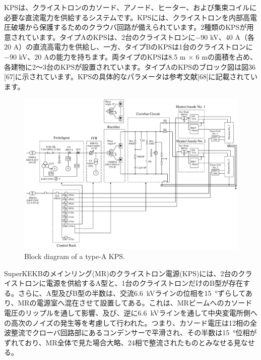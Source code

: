 \documentclass[book,openany]{jlreq}
\theoremstyle{definition}
\begin{document}
KPSは、クライストロンのカソード、アノード、ヒーター、および集束コイルに必要な直流電力を供給するシステムです。KPSには、クライストロンを内部高電圧破壊から保護するためのクラウバ回路が備えられています。2種類のKPSが用意されています。タイプAのKPSは、2台のクライストロンに−90 kV、40 A（各20 A）の直流高電力を供給し、一方、タイプBのKPSは1台のクライストロンに−90 kV、20 Aの能力を持ちます。両タイプのKPSは8.5 m × 6 mの面積を占め、各建物に2～3台のKPSが設置されています。タイプAのKPSのブロック図は図36 [67]に示されています。KPSの具体的なパラメータは参考文献[68]に記載されています。
%
\begin{figure}[!htt]
    \begin{center}
        \includegraphics[width=\linewidth]{figs/skeleton-diagram.pdf}
        \caption{Block diagram of a type-A KPS.}
        \label{fig:KPS}
    \end{center}
\end{figure}


SuperKEKBのメインリング(MR)のクライストロン電源(KPS)には、2台のクライストロンに電源を供給するA型と、1台のクライストロンだけのB型が存在する。さらに、A型及びB型の半数は、交流\qty{6.6}{\kilo\volt}ラインの位相を\qty{15}{\degree}ずらしてあり、MRの電源室へ混在させて設置してある。これは、MRビームへのカソード電圧のリップルを通して影響、及び、逆に\qty{6.6}{\kilo\volt}ラインを通して中央変電所側への高次のノイズの発生等を考慮して行われた。つまり、カソード電圧は12相の全波整流でクローバ回路部にあるコンデンサーで平滑され、その半数は\qty{15}{\degree}位相がずれており、MR全体で見た場合大略、24相で整流されたものとみなせる見なせる。
\end{document}
